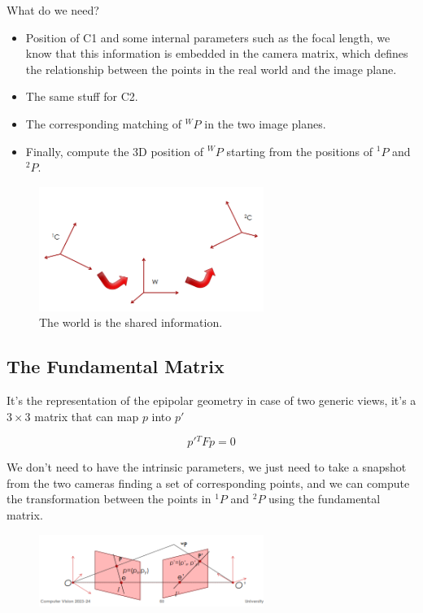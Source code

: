 What do we need?
\begin{itemize}
\item Position of C1 and some internal parameters such as the focal
length, we know that this information is embedded in the camera matrix, which defines the relationship between the points in the real world and the image plane.
\item The same stuff for C2.
\item The corresponding matching of \({}^WP\) in the two image planes.
\item Finally, compute the 3D position of \({}^WP\) starting from the positions of \({}^1P\) and \({}^2P\).
\end{itemize}
\begin{figure}[H]
    \centering
    \includegraphics[width=0.65\textwidth]{Figures/world.png}
    \caption{The world is the shared information.}
    \label{fig:world}
\end{figure}

\subsection{The Fundamental Matrix}

It's the representation of the epipolar geometry in case of two generic views, it's a \(3\times3\) matrix that can map \(p\) into \(p'\) 

\[
    p' {}^TFp=0
\]

We don't need to have the intrinsic parameters, we just need to take a snapshot from the two cameras finding a set of corresponding points, and we can compute the transformation between the points in \({}^1P\) and \({}^2P\) using the fundamental matrix. 

\begin{figure}[H]
    \centering
    \includegraphics[width=0.65\textwidth]{Figures/found.png}
    \label{fig:found}
\end{figure}

